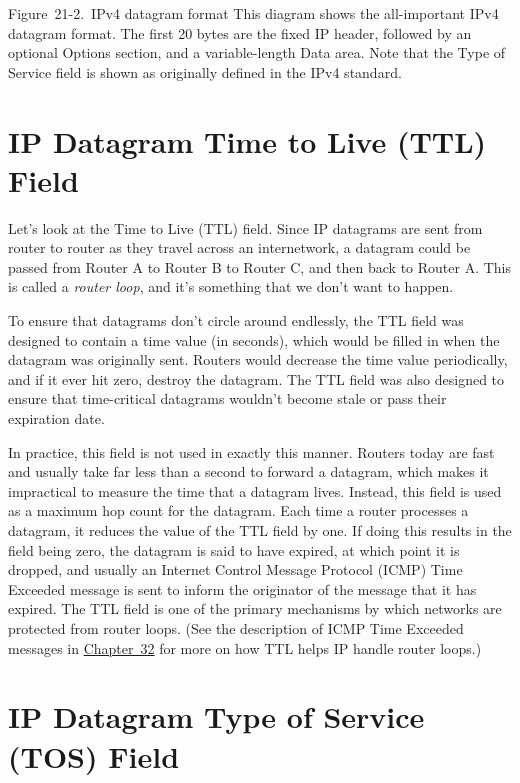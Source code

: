 Figure~21-2.~IPv4 datagram format This diagram shows the all-important
IPv4 datagram format. The first 20 bytes are the fixed IP header,
followed by an optional Options section, and a variable-length Data
area. Note that the Type of Service field is shown as originally defined
in the IPv4 standard.

\section{IP Datagram Time to Live (TTL) Field}

Let's look at the
Time to
Live (TTL) field. Since IP datagrams are sent from router to router as
they travel across an internetwork, a datagram could be passed from
Router A to Router B to Router C, and then back to Router A. This is
called a \emph{router loop}, and it's something that we don't want to
happen.

To ensure that datagrams don't circle around endlessly, the TTL
field was
designed to contain a time value (in seconds), which would be filled in
when the datagram was originally sent. Routers would decrease the time
value periodically, and if it ever hit zero, destroy the datagram. The
TTL field
was also designed to ensure that time-critical datagrams wouldn't become
stale or pass their expiration date.

In practice, this field is not used in exactly this manner. Routers
today are fast and usually take far less than a second to forward a
datagram, which makes it impractical to measure the time that a datagram
lives. Instead, this field is used as a maximum hop count for the
datagram. Each time a router processes a datagram, it reduces the value
of the TTL field by one. If doing this results in the field being zero,
the datagram is said to have expired, at which point it is dropped, and
usually an Internet Control Message Protocol (ICMP) Time Exceeded
message is sent to inform the originator of the message that it has
expired. The TTL field is one of the primary mechanisms by which
networks are protected from
router
loops. (See the description of ICMP Time Exceeded messages in
\protect\hyperlink{ch32.html}{Chapter~32} for more on how TTL helps IP
handle router
loops.)





\section{IP Datagram Type of Service (TOS) Field}

